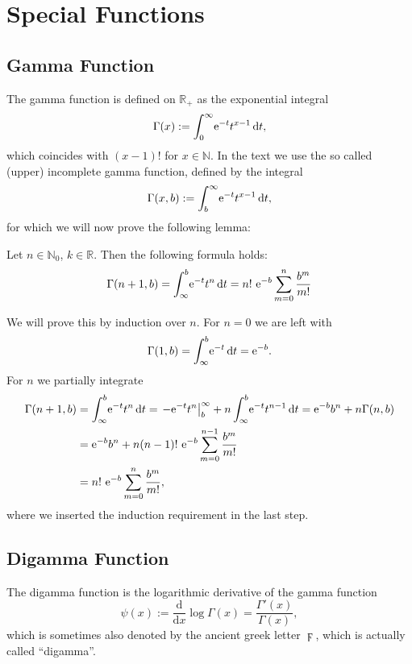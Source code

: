 \section{Special Functions}
\subsection{Gamma Function}
\label{app:gamma}
The gamma function is defined on $\mathbb{R}_{+}$ as the exponential integral
\begin{equation}
  \Gamma(x) := \Integ[\infty]{0}{t}{\Eto{-t}t^{x-1}},
  \label{def:gamma}
\end{equation}
which coincides with $(x-1)!$ for $x\in\mathbb{N}$. In the text we use the so
called (upper) incomplete gamma function, defined by the integral
\begin{equation}
  \Gamma(x,b) := \Integ[\infty]{b}{t}{\Eto{-t}t^{x-1}},
\end{equation}
for which we will now prove the following lemma:
\begin{Lemma}
  \label{lem:incomplete-gamma}
  Let $n\in\mathbb{N}_0$, $k\in\mathbb{R}$. Then the following formula holds:
  \begin{equation}
    \Gamma(n+1, b) = \Integ[b]{\infty}{t}{\Eto{-t} t^n} = n!{\ }
    \Eto{-b}\sum_{m=0}^n \frac{b^m}{m!}
  \end{equation}
  \begin{Proof}
    We will prove this by induction over $n$. For $n = 0$ we are left with
    \begin{equation*}
      \Gamma(1, b) = \Integ[b]{\infty}{t}{\Eto{-t}} = \Eto{-b}.
    \end{equation*}
    For $n$ we partially integrate
    \begin{align*}
      \Gamma(n+1, b) &= \Integ[b]{\infty}{t}{\Eto{-t} t^n} 
                     = \left.-\Eto{-t} t^n \right|_{b}^{\infty} +
      n\Integ[b]{\infty}{t}{\Eto{-t}t^{n-1}}
      = \Eto{-b} b^n + n\Gamma(n, b) \\
      &= \Eto{-b} b^n + n (n-1)!\ \Eto{-b}\sum_{m=0}^{n-1} \frac{b^m}{m!} \\
      &= n!\ \Eto{-b} \sum_{m=0}^n \frac{b^m}{m!},
    \end{align*}
    where we inserted the induction requirement in the last step.
  \end{Proof}
\end{Lemma}

\subsection{Digamma Function}
The digamma function is the logarithmic derivative of the gamma function
\begin{equation}
    \psi(x) := \frac{\mathrm d}{\mathrm dx}\log{\Gamma(x)}
            = \frac{\Gamma'(x)}{\Gamma(x)},
    \label{def:digamma}
\end{equation}
which is sometimes also denoted by the ancient greek letter $\digamma$, which is
actually called ``digamma''.

